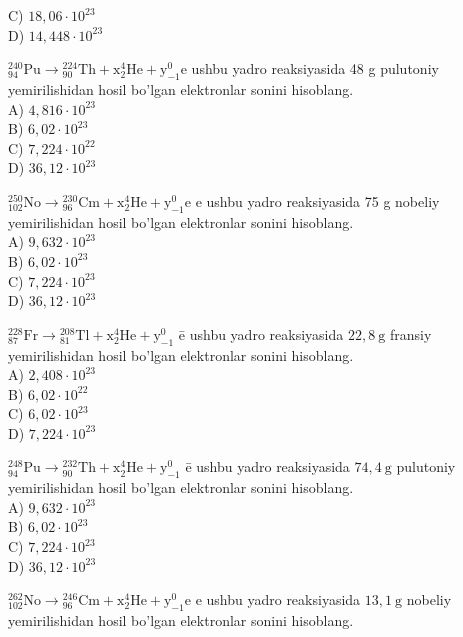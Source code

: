 C) $18,06 \cdot 10^{23}$\\
D) $14,448 \cdot 10^{23}$
  \item ${ }_{94}^{240} \mathrm{Pu} \rightarrow{ }_{90}^{224} \mathrm{Th}+\mathrm{x}_{2}^{4} \mathrm{He}+\mathrm{y}_{-1}^{0} \mathrm{e}$ ushbu yadro reaksiyasida 48 g pulutoniy yemirilishidan hosil bo'lgan elektronlar sonini hisoblang.\\
A) $4,816 \cdot 10^{23}$\\
B) $6,02 \cdot 10^{23}$\\
C) $7,224 \cdot 10^{22}$\\
D) $36,12 \cdot 10^{23}$
  \item ${ }_{102}^{250} \mathrm{No} \rightarrow{ }_{96}^{230} \mathrm{Cm}+\mathrm{x}_{2}^{4} \mathrm{He}+\mathrm{y}_{-1}^{0} \mathrm{e}$ e ushbu yadro reaksiyasida 75 g nobeliy yemirilishidan hosil bo'lgan elektronlar sonini hisoblang.\\
A) $9,632 \cdot 10^{23}$\\
B) $6,02 \cdot 10^{23}$\\
C) $7,224 \cdot 10^{23}$\\
D) $36,12 \cdot 10^{23}$
  \item ${ }_{87}^{228} \mathrm{Fr} \rightarrow{ }_{81}^{208} \mathrm{Tl}+\mathrm{x}_{2}^{4} \mathrm{He}+\mathrm{y}_{-1}^{0}$ ē ushbu yadro reaksiyasida $22,8 \mathrm{~g}$ fransiy yemirilishidan hosil bo'lgan elektronlar sonini hisoblang.\\
A) $2,408 \cdot 10^{23}$\\
B) $6,02 \cdot 10^{22}$\\
C) $6,02 \cdot 10^{23}$\\
D) $7,224 \cdot 10^{23}$
  \item ${ }_{94}^{248} \mathrm{Pu} \rightarrow{ }_{90}^{232} \mathrm{Th}+\mathrm{x}_{2}^{4} \mathrm{He}+\mathrm{y}_{-1}^{0}$ ē ushbu yadro reaksiyasida $74,4 \mathrm{~g}$ pulutoniy yemirilishidan hosil bo'lgan elektronlar sonini hisoblang.\\
A) $9,632 \cdot 10^{23}$\\
B) $6,02 \cdot 10^{23}$\\
C) $7,224 \cdot 10^{23}$\\
D) $36,12 \cdot 10^{23}$
  \item ${ }_{102}^{262} \mathrm{No} \rightarrow{ }_{96}^{246} \mathrm{Cm}+\mathrm{x}_{2}^{4} \mathrm{He}+\mathrm{y}_{-1}^{0} \mathrm{e}$ e ushbu yadro reaksiyasida $13,1 \mathrm{~g}$ nobeliy yemirilishidan hosil bo'lgan elektronlar sonini hisoblang.\\
